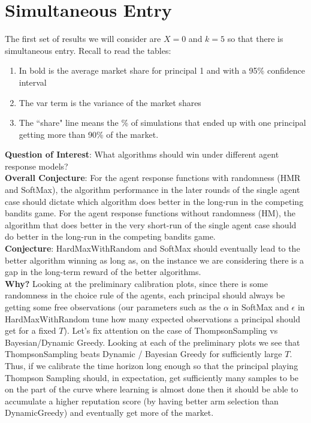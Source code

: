 \documentclass[11pt,letterpaper]{article}
\begin{document}
\section*{Simultaneous Entry}

The first set of results we will consider are $X = 0$ and $k = 5$ so that there is simultaneous entry. Recall to read the tables: \\
\begin{enumerate}
\item In bold is the average market share for principal 1 and with a 95\% confidence interval
\item The var term is the variance of the market shares
\item The ``share" line means the \% of simulations that ended up with one principal getting more than 90\% of the market.
\end{enumerate}


\textbf{Question of Interest}: What algorithms should win under different agent response models? \\
\textbf{Overall Conjecture}: For the agent response functions with randomness (HMR and SoftMax), the algorithm performance in the later rounds of the single agent case should dictate which algorithm does better in the long-run in the competing bandits game. For the agent response functions without randomness (HM), the algorithm that does better in the very short-run of the single agent case should do better in the long-run in the competing bandits game. \\
\textbf{Conjecture}: HardMaxWithRandom and SoftMax should eventually lead to the better algorithm winning as long as, on the instance we are considering there is a gap in the long-term reward of the better algorithms. \\
\textbf{Why?} Looking at the preliminary calibration plots, since there is some randomness in the choice rule of the agents, each principal should always be getting some free observations (our parameters such as the $\alpha$ in SoftMax and $\epsilon$ in HardMaxWithRandom tune how many expected observations a principal should get for a fixed $T$).  Let's fix attention on the case of ThompsonSampling vs Bayesian/Dynamic Greedy. Looking at each of the preliminary plots we see that ThompsonSampling beats Dynamic / Bayesian Greedy for sufficiently large $T$. Thus, if we calibrate the time horizon long enough so that the principal playing Thompson Sampling should, in expectation, get sufficiently many samples to be on the part of the curve where learning is almost done then it should be able to accumulate a higher reputation score (by having better arm selection than DynamicGreedy) and eventually get more of the market. \\
\end{document}
